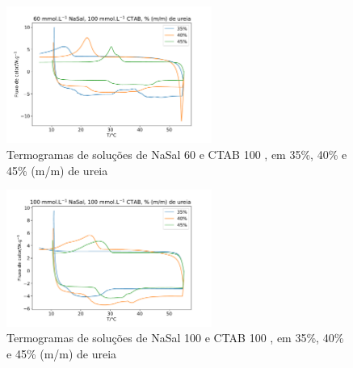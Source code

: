 %		
%	
%	

	\begin{figure}[H]
		\centering
		\includegraphics[width=0.60\textwidth]{./imagens/dsc/NaSal60}
		\caption{Termogramas de soluções de NaSal 60\mM{} e CTAB 100 \mM{}, em 35\%, 40\% e 45\% (m/m) de ureia}
		\label{fig:DSC_NaSal60}
	\end{figure}

	\begin{figure}[H]
		\centering
		\includegraphics[width=0.60\textwidth]{./imagens/dsc/NaSal100}
		\caption{Termogramas de soluções de NaSal 100\mM{} e CTAB 100 \mM{}, em 35\%, 40\% e 45\% (m/m) de ureia}
		\label{fig:DSC_NaSal100}
	\end{figure}

